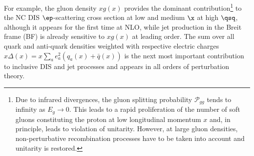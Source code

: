 For example, the gluon density $xg\left(x\right)$ provides the dominant contribution\footnote{Due to infrared divergences, the gluon splitting probability $\mathcal{P}_{gg}$ tends to infinity as $E_g \rightarrow 0$. This leads to a rapid proliferation of the number of soft gluons constituting the proton at low longitudinal momentum $x$ and, in principle, leads to violation of unitarity. However, at large gluon densities, non-perturbative recombination processes have to be taken into account and unitarity is restored.} to the NC DIS $\ep$-scattering cross section at low and medium $\x$ at high $\qsq$, although it appears for the first time at NLO, while jet production in the Breit frame (BF) is already sensitive to $xg\left(x\right)$ at leading order. The sum over all quark and anti-quark densities weighted with respective electric charges $x\Delta\left(x\right)=x\sum_{a}{e_a^2\left(q_a\left(x\right)+\bar{q}\left(x\right)\right)}$ is the next most important contribution to inclusive DIS and jet processes and appears in all orders of perturbation theory.
